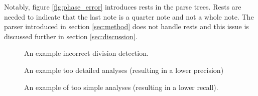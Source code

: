 Notably, figure \ref{fig:phase_error} introduces rests in the parse trees. Rests are needed to indicate that the last note is a quarter note and not a whole note. The parser introduced in section \ref{sec:method} does not handle rests and this issue is discussed further in section \ref{sec:discussion}.
\begin{figure}
\centering
{}
\caption{An example incorrect division detection.}
\label{fig:div_error}
\end{figure}


\begin{figure}
\centering
{}
\caption{An example too detailed analyses (resulting in a lower precision)}
\label{fig:precision_error}
\end{figure}

\begin{figure}
\centering
\caption{An example of too simple analyses (resulting in a lower recall).}
\label{fig:recall_error}
\end{figure}



